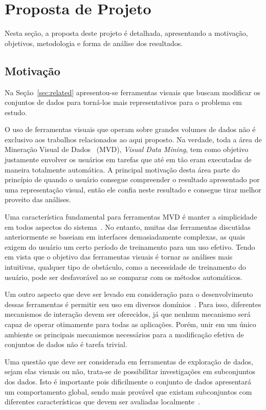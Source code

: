 \section{Proposta de Projeto}

Nesta seção, a proposta deste projeto é detalhada, apresentando a motivação, objetivos, metodologia e forma de análise dos resultados.

\subsection{Motivação}

Na Seção~\ref{sec:related} apresentou-se ferramentas visuais
que buscam modificar os conjuntos de dados para torná-los
mais representativos para o problema em estudo. 

O uso de ferramentas visuais que operam sobre grandes
volumes de dados não é exclusivo aos trabalhos relacionados
ao aqui proposto. Na verdade, toda a área de
Mineração Visual de Dados~\cite{Wong1999} (MVD),
\emph{Visual Data Mining}, tem como objetivo justamente
envolver os usuários em tarefas que até em tão eram
executadas de maneira totalmente automática. A principal
motivação desta área parte do princípio de quando o usuário
consegue compreender o resultado apresentado por uma
representação visual, então ele confia neste resultado e
consegue tirar melhor proveito das análises.

Uma característica fundamental para ferramentas MVD é manter
a simplicidade em todos aspectos do sistema~\cite{Wong1999}.
No entanto, muitas das ferramentas discutidas anteriormente
se baseiam em interfaces demasiadamente complexas, as quais
exigem do usuário um certo período de treinamento para um
uso efetivo. Tendo em vista que o objetivo das ferramentas
visuais é tornar as análises mais intuitivas, qualquer tipo
de obstáculo, como a necessidade de treinamento do usuário,
pode ser desfavorável ao se comparar com os métodos
automáticos.

Um outro aspecto que deve ser levado em consideração para o
desenvolvimento dessas ferramentas é permitir seu uso em
diversos domínios~\cite{Wong1999}. Para isso, diferentes
mecanismos de interação devem ser oferecidos, já que nenhum
mecanismo será capaz de operar otimamente para todas as
aplicações. Porém, unir em um único ambiente os principais
mecanismos necessários para a modificação efetiva de
conjuntos de dados não é tarefa trivial.

Uma questão que deve ser considerada em ferramentas de
exploração de dados, sejam elas visuais ou não, trata-se de
possibilitar investigações em subconjuntos dos dados. Isto é
importante pois dificilmente o conjunto de dados apresentará
um comportamento global, sendo mais provável que existam
subconjuntos com diferentes características que devem ser
avaliadas localmente~\cite{May2011}.

